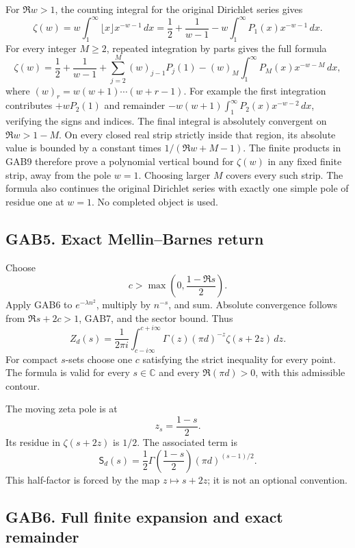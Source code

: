 \documentclass[
  10pt,
  a4paper,
]{article}
\begin{document}
For \(\Re w>1\), the counting integral for the original Dirichlet series
gives \[
 \zeta(w)=w\int_1^\infty\lfloor x\rfloor x^{-w-1}\,dx
   =\frac12+\frac1{w-1}
                  -w\int_1^\infty P_1(x)x^{-w-1}\,dx.
\] For every integer \(M\ge2\), repeated integration by parts gives the
full formula \[
 \zeta(w)=\frac12+\frac1{w-1}
 +\sum_{j=2}^{M}(w)_{j-1}P_j(1)
 -(w)_M\int_1^\infty P_M(x)x^{-w-M}\,dx,       \tag{GAB9}
\] where \((w)_r=w(w+1)\cdots(w+r-1)\). For example the first
integration contributes \(+wP_2(1)\) and remainder
\(-w(w+1)\int_1^\infty P_2(x)x^{-w-2}\,dx\), verifying the signs and
indices. The final integral is absolutely convergent on \(\Re w>1-M\).
On every closed real strip strictly inside that region, its absolute
value is bounded by a constant times \(1/(\Re w+M-1)\). The finite
products in GAB9 therefore prove a polynomial vertical bound for
\(\zeta(w)\) in any fixed finite strip, away from the pole \(w=1\).
Choosing larger \(M\) covers every such strip. The formula also
continues the original Dirichlet series with exactly one simple pole of
residue one at \(w=1\). No completed object is used.

\subsection{GAB5. Exact Mellin--Barnes
return}\label{gab5.-exact-mellinbarnes-return}

Choose \[
 c>\max\left(0,\frac{1-\Re s}{2}\right).
\] Apply GAB6 to \(e^{-\lambda n^2}\), multiply by \(n^{-s}\), and sum.
Absolute convergence follows from \(\Re s+2c>1\), GAB7, and the sector
bound. Thus \[
 \boxed{\displaystyle
 Z_d(s)=\frac1{2\pi i}\int_{c-i\infty}^{c+i\infty}
       \Gamma(z)(\pi d)^{-z}\zeta(s+2z)\,dz.}
                                                        \tag{GAB10}
\] For compact \(s\)-sets choose one \(c\) satisfying the strict
inequality for every point. The formula is valid for every
\(s\in\mathbb C\) and every \(\Re(\pi d)>0\), with this admissible
contour.

The moving zeta pole is at \[
 z_s=\frac{1-s}{2}.
\] Its residue in \(\zeta(s+2z)\) is \(1/2\). The associated term is \[
 \mathsf S_d(s)=\frac12\Gamma\!\left(\frac{1-s}{2}\right)
                    (\pi d)^{(s-1)/2}.                 \tag{GAB11}
\] This half-factor is forced by the map \(z\mapsto s+2z\); it is not an
optional convention.

\subsection{GAB6. Full finite expansion and exact
remainder}\label{gab6.-full-finite-expansion-and-exact-remainder}
\end{document}
